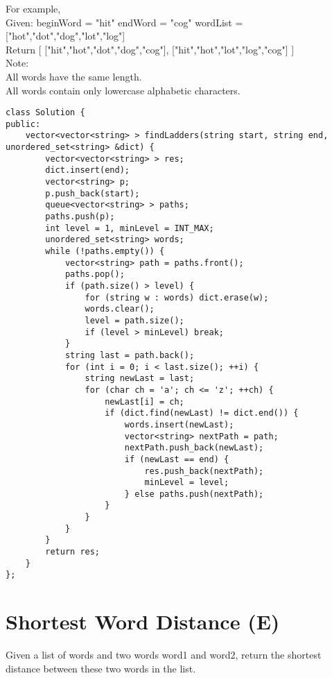 For example,\\
Given:
beginWord = "hit"
endWord = "cog"
wordList = ["hot","dot","dog","lot","log"]\\

Return
  [
    ["hit","hot","dot","dog","cog"],
    ["hit","hot","lot","log","cog"]
  ]\\

Note:\\
    All words have the same length.\\
    All words contain only lowercase alphabetic characters.\\

\begin{lstlisting}
class Solution {
public:
    vector<vector<string> > findLadders(string start, string end, unordered_set<string> &dict) {
        vector<vector<string> > res;
        dict.insert(end);
        vector<string> p;
        p.push_back(start);
        queue<vector<string> > paths;
        paths.push(p);
        int level = 1, minLevel = INT_MAX;
        unordered_set<string> words;
        while (!paths.empty()) {
            vector<string> path = paths.front();
            paths.pop();
            if (path.size() > level) {
                for (string w : words) dict.erase(w);
                words.clear();
                level = path.size();
                if (level > minLevel) break;
            }
            string last = path.back();
            for (int i = 0; i < last.size(); ++i) {
                string newLast = last;
                for (char ch = 'a'; ch <= 'z'; ++ch) {
                    newLast[i] = ch;
                    if (dict.find(newLast) != dict.end()) {
                        words.insert(newLast);
                        vector<string> nextPath = path;
                        nextPath.push_back(newLast);
                        if (newLast == end) {
                            res.push_back(nextPath);
                            minLevel = level;
                        } else paths.push(nextPath);
                    }
                }
            }            
        }
        return res;
    }
};
\end{lstlisting}


\section{Shortest Word Distance (E)}
Given a list of words and two words word1 and word2, return the shortest distance between these two words in the list.\\

